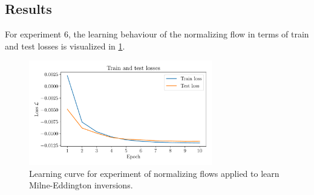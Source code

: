 \documentclass[a4paper,11pt]{report}
\def\fc#1{{\color{black}{#1}}} %
\def\lk#1{{\color{black}{#1}}}
\begin{document}
\subsection{Results}
For experiment 6, the learning behaviour of the normalizing flow in terms of train and test losses is visualized in \cref{fig:nf-milne-eddington-example-7-loss-nflows-piecewisequadratic}. \fc{Both the train and test loss seem to steadily decrease to nearly constant values towards the end of the training process. Looking closely at the gap between both curves, one can ascertain a minimal growth of the gap. However, this gap remains very narrow for epochs 5 to 10.}
\begin{figure}[h!]
	\centering
	\includegraphics[width=8cm]{figures/nf-milne-eddington-example-7-loss-nflows-piecewisequadratic.pdf}
	\caption{Learning curve for experiment \lk{6} of normalizing flows applied to learn Milne-Eddington inversions.}
	\label{fig:nf-milne-eddington-example-7-loss-nflows-piecewisequadratic}
\end{figure}
\end{document}
